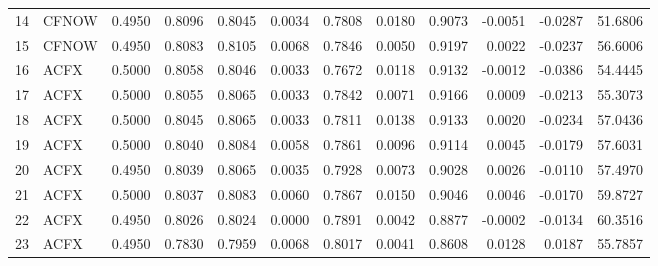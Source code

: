 \begin{tabular}{rlrrrrrrrrrr}
 14 &  CFNOW &  0.4950 &     0.8096 &  0.8045 &     0.0034 &   0.7808 &      0.0180 &      0.9073 &  -0.0051 &   -0.0287 &  51.6806 \\
 15 &  CFNOW &  0.4950 &     0.8083 &  0.8105 &     0.0068 &   0.7846 &      0.0050 &      0.9197 &   0.0022 &   -0.0237 &  56.6006 \\
 16 &   ACFX &  0.5000 &     0.8058 &  0.8046 &     0.0033 &   0.7672 &      0.0118 &      0.9132 &  -0.0012 &   -0.0386 &  54.4445 \\
 17 &   ACFX &  0.5000 &     0.8055 &  0.8065 &     0.0033 &   0.7842 &      0.0071 &      0.9166 &   0.0009 &   -0.0213 &  55.3073 \\
 18 &   ACFX &  0.5000 &     0.8045 &  0.8065 &     0.0033 &   0.7811 &      0.0138 &      0.9133 &   0.0020 &   -0.0234 &  57.0436 \\
 19 &   ACFX &  0.5000 &     0.8040 &  0.8084 &     0.0058 &   0.7861 &      0.0096 &      0.9114 &   0.0045 &   -0.0179 &  57.6031 \\
 20 &   ACFX &  0.4950 &     0.8039 &  0.8065 &     0.0035 &   0.7928 &      0.0073 &      0.9028 &   0.0026 &   -0.0110 &  57.4970 \\
 21 &   ACFX &  0.5000 &     0.8037 &  0.8083 &     0.0060 &   0.7867 &      0.0150 &      0.9046 &   0.0046 &   -0.0170 &  59.8727 \\
 22 &   ACFX &  0.4950 &     0.8026 &  0.8024 &     0.0000 &   0.7891 &      0.0042 &      0.8877 &  -0.0002 &   -0.0134 &  60.3516 \\
 23 &   ACFX &  0.4950 &     0.7830 &  0.7959 &     0.0068 &   0.8017 &      0.0041 &      0.8608 &   0.0128 &    0.0187 &  55.7857 \\
\bottomrule
\end{tabular}
